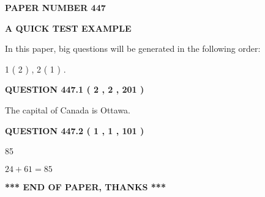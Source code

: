 \documentclass[12pt]{article}
\begin{document}
   
\newpage 
\setcounter{page}{ 
   447001 } 
   
   
   
   
 {\textbf{ \Large{ PAPER NUMBER  447  }}}
   
   
\vspace{0.2in}
   
   
   
   
   
   
 \vspace{0.2in}
{\LARGE {\textbf{ A QUICK TEST EXAMPLE}}}
   
   
   
\vspace{0.2in}
   
In this paper, big questions will be generated in the following order: 
   
   
   1 ( 2 )
 ,
   2 ( 1 )
 .
  
\vspace{0.2in}
  
{\textbf{\Large{QUESTION
447.1 
 ( 2 , 2 , 201 )
}}}
  
  
 
 
\noindent{}
 
 
The capital of Canada is Ottawa.
 
 
 
 
  
\vspace{0.2in}
  
{\textbf{\Large{QUESTION
447.2 
 ( 1 , 1 , 101 )
}}}
  
  
 
 
\noindent{}

85
 
 
 
 
\noindent{}

$ %
24 +  %
61=   %
85$
 
 
   
   
 \vspace{0.2in}
 
   
   
   
   
\vspace{1.0in} 
{\textbf{\large{ *** END OF PAPER, THANKS *** }}} 
   
\end{document}
